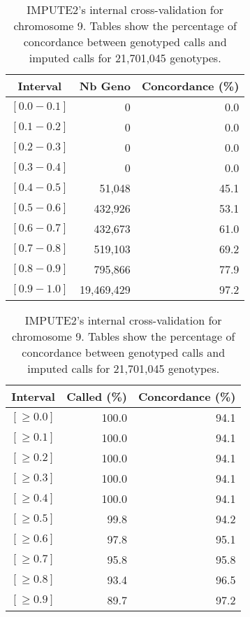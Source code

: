 \documentclass[10pt,twoside,english]{scrartcl}
\begin{document}
\begin{table}[H]
\protect\caption{IMPUTE2's internal cross-validation for chromosome 9. Tables show the
percentage of concordance between genotyped calls and imputed calls
for 21,701,045 genotypes.\label{tab:cross_validation_chr_9}}

\centering

\begin{tabular}{crr}
\hline 
\multicolumn{1}{c}{\textbf{Interval}}
 & \multicolumn{1}{c}{\textbf{Nb Geno}}
 & \multicolumn{1}{c}{\textbf{Concordance (\%)}}
\\
\hline 

$[0.0-0.1]$ & 0 & 0.0\\
$[0.1-0.2]$ & 0 & 0.0\\
$[0.2-0.3]$ & 0 & 0.0\\
$[0.3-0.4]$ & 0 & 0.0\\
$[0.4-0.5]$ & 51,048 & 45.1\\
$[0.5-0.6]$ & 432,926 & 53.1\\
$[0.6-0.7]$ & 432,673 & 61.0\\
$[0.7-0.8]$ & 519,103 & 69.2\\
$[0.8-0.9]$ & 795,866 & 77.9\\
$[0.9-1.0]$ & 19,469,429 & 97.2\\
\hline 
\end{tabular}
\hfill
\begin{tabular}{crr}
\hline 
\multicolumn{1}{c}{\textbf{Interval}}
 & \multicolumn{1}{c}{\textbf{Called (\%)}}
 & \multicolumn{1}{c}{\textbf{Concordance (\%)}}
\\
\hline 

$[\geq 0.0]$ & 100.0 & 94.1\\
$[\geq 0.1]$ & 100.0 & 94.1\\
$[\geq 0.2]$ & 100.0 & 94.1\\
$[\geq 0.3]$ & 100.0 & 94.1\\
$[\geq 0.4]$ & 100.0 & 94.1\\
$[\geq 0.5]$ & 99.8 & 94.2\\
$[\geq 0.6]$ & 97.8 & 95.1\\
$[\geq 0.7]$ & 95.8 & 95.8\\
$[\geq 0.8]$ & 93.4 & 96.5\\
$[\geq 0.9]$ & 89.7 & 97.2\\
\hline 
\end{tabular}


\end{table}
\end{document}
